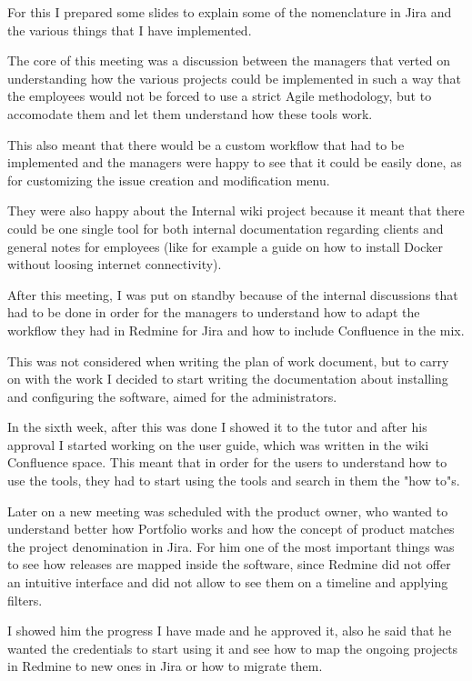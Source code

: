 	For this I prepared some slides to explain some of the nomenclature in Jira and the various things that I have implemented.
	
	The core of this meeting was a discussion between the managers that verted on understanding how the various projects could be implemented in such a way that the employees would not be forced to use a strict Agile methodology, but to accomodate them and let them understand how these tools work.
	
	This also meant that there would be a custom workflow that had to be implemented and the managers were happy to see that it could be easily done, as for customizing the issue creation and modification menu.
	
	
	They were also happy about the Internal wiki project because it meant that there could be one single tool for both internal documentation regarding clients and general notes for employees (like for example a guide on how to install Docker without loosing internet connectivity).
	
	After this meeting, I was put on standby because of the internal discussions that had to be done in order for the managers to understand how to adapt the workflow they had in Redmine for Jira and how to include Confluence in the mix.
	
	This was not considered when writing the plan of work document, but to carry on with the work I decided to start writing the documentation about installing and configuring the software, aimed for the administrators.
	
	In the sixth week, after this was done I showed it to the tutor and after his approval I started working on the user guide, which was written in the wiki Confluence space.
	This meant that in order for the users to understand how to use the tools, they had to start using the tools and search in them the "how to"s.
	
	Later on a new meeting was scheduled with the product owner, who wanted to understand better how Portfolio works and how the concept of product matches the project denomination in Jira.
	For him one of the most important things was to see how releases are mapped inside the software, since Redmine did not offer an intuitive interface and did not allow to see them on a timeline and applying filters.
	
	I showed him the progress I have made and he approved it, also he said that he wanted the credentials to start using it and see how to map the ongoing projects in Redmine to new ones in Jira or how to migrate them.
	
